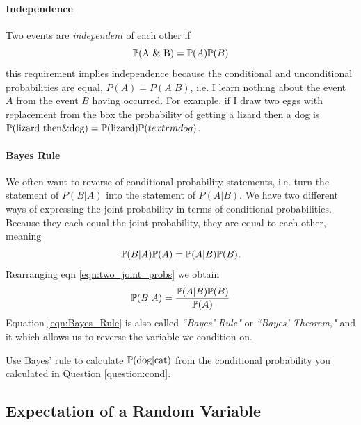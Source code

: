 \paragraph{Independence}
Two events are \emph{independent} of each other if
\begin{equation}
\P(\textrm{A \& B}) = \P(A) \P(B) \label{eqn:basic_indie}
\end{equation}
this requirement implies independence because the conditional and
unconditional probabilities are equal, $P(A) = P(A | B)$, i.e. I learn
nothing about the event $A$ from the event $B$ having occurred. 
For example, if I draw two eggs with replacement from the box the
probability of getting a lizard then a dog is $\P(\textrm{lizard then} \& \textrm{dog}) =
\P(\textrm{lizard}) \P( textrm{dog})$. 


\paragraph{Bayes Rule}
We often want to reverse of conditional probability statements,
i.e. turn the statement of $P(B | A)$ into the statement of $P(A |
B)$. 
We have two different ways of expressing the joint probability in terms of conditional probabilities. Because they each equal the joint probability, they are equal to each other, meaning
\begin{equation}
\P(B | A) \P(A) =  \P(A | B) \P(B) . \label{eqn:two_joint_probs}
 \end{equation}
Rearranging eqn \eqref{eqn:two_joint_probs} we obtain 
\begin{equation}
\P(B | A) =  \frac{\P(A | B) \P(B) }{\P(A)} \label{eqn:Bayes_Rule}
 \end{equation}
Equation \eqref{eqn:Bayes_Rule} is also called \emph{``Bayes' Rule"} or \emph{``Bayes' Theorem,"} and it  which allows us to reverse the variable we
condition on. 
\begin{question}
Use Bayes' rule to calculate $\P(\textrm{dog} | \textrm{cat})$ from
the conditional probability you calculated in Question
\ref{question:cond}.\\
 \end{question}


\subsection*{Expectation of a Random Variable}

